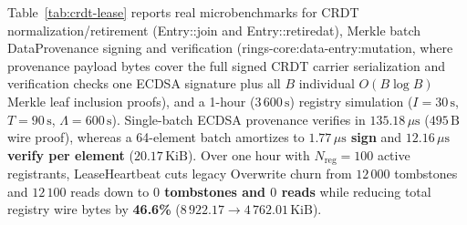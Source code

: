 \documentclass[journal]{IEEEtran}
\DeclareRobustCommand{\code}[1]{{\ttfamily\renewcommand{\_}{\textunderscore\allowbreak}#1}}
\begin{document}
Table~\ref{tab:crdt-lease} reports real microbenchmarks for CRDT normalization/retirement (\code{Entry::join} and \code{Entry::retired\_at}), Merkle batch \code{DataProvenance} signing and verification (\code{rings-core:data-entry:mutation}, where provenance payload bytes cover the full signed CRDT carrier serialization and verification checks one ECDSA signature plus all $B$ individual $O(B\log B)$ Merkle leaf inclusion proofs), and a 1-hour ($3\,600\,\text{s}$) registry simulation ($I=30\,\text{s}$, $T=90\,\text{s}$, $\Lambda=600\,\text{s}$). Single-batch ECDSA provenance verifies in $135.18\,\mu\text{s}$ ($495\,\text{B}$ wire proof), whereas a 64-element batch amortizes to \textbf{$1.77\,\mu\text{s}$ sign} and \textbf{$12.16\,\mu\text{s}$ verify per element} ($20.17\,\text{KiB}$). Over one hour with $N_{\mathrm{reg}}=100$ active registrants, \code{LeaseHeartbeat} cuts legacy Overwrite churn from $12\,000$ tombstones and $12\,100$ reads down to \textbf{$0$ tombstones and $0$ reads} while reducing total registry wire bytes by \textbf{46.6\%} ($8\,922.17\to 4\,762.01\,\text{KiB}$).
\end{document}
